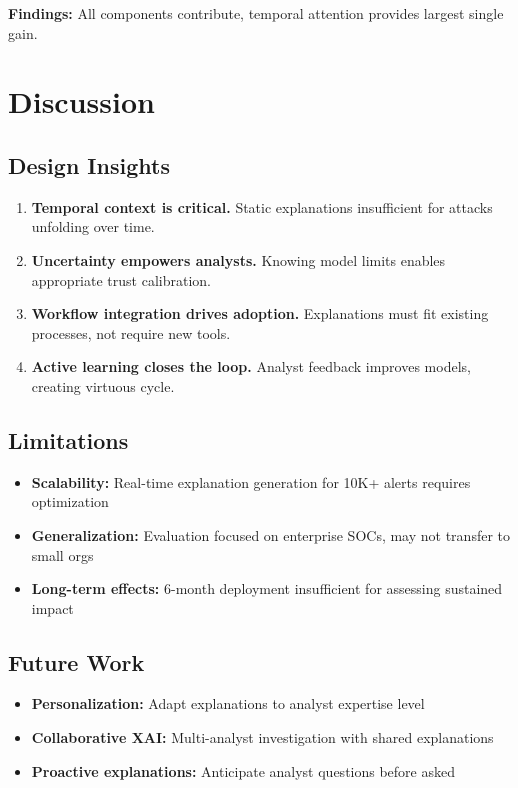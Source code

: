 \documentclass[letterpaper,twocolumn,10pt]{article}
\begin{document}
\textbf{Findings:} All components contribute, temporal attention provides largest single gain.

\section{Discussion}

\subsection{Design Insights}
\begin{enumerate}
\item \textbf{Temporal context is critical.} Static explanations insufficient for attacks unfolding over time.
\item \textbf{Uncertainty empowers analysts.} Knowing model limits enables appropriate trust calibration.
\item \textbf{Workflow integration drives adoption.} Explanations must fit existing processes, not require new tools.
\item \textbf{Active learning closes the loop.} Analyst feedback improves models, creating virtuous cycle.
\end{enumerate}

\subsection{Limitations}
\begin{itemize}
\item \textbf{Scalability:} Real-time explanation generation for 10K+ alerts requires optimization
\item \textbf{Generalization:} Evaluation focused on enterprise SOCs, may not transfer to small orgs
\item \textbf{Long-term effects:} 6-month deployment insufficient for assessing sustained impact
\end{itemize}

\subsection{Future Work}
\begin{itemize}
\item \textbf{Personalization:} Adapt explanations to analyst expertise level
\item \textbf{Collaborative XAI:} Multi-analyst investigation with shared explanations
\item \textbf{Proactive explanations:} Anticipate analyst questions before asked
\end{itemize}
\end{document}
